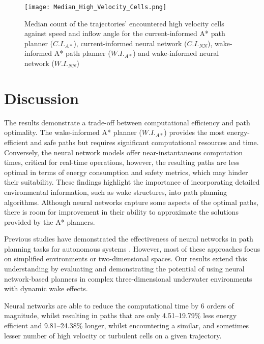 \documentclass[final,5p,times,twocolumn]{elsarticle}
\begin{document}
\begin{figure*}[!h]
    \centering
    \texttt{[image: Median\_High\_Velocity\_Cells.png]}
    \caption{Median count of the trajectories' encountered high velocity cells against speed and inflow angle for the current-informed A* path planner ($C.I._{A*}$), current-informed neural network ($C.I._{NN}$), wake-informed A* path planner ($W.I._{A*}$) and wake-informed neural network ($W.I._{NN}$) }
    \label{fig:median_highvelocity}
\end{figure*}



\section{Discussion} 
\label{Discussion}

The results demonstrate a trade-off between computational efficiency and path optimality. The wake-informed A* planner ($W.I._{A*}$) provides the most energy-efficient and safe paths but requires significant computational resources and time. Conversely, the neural network models offer near-instantaneous computation times, critical for real-time operations, however, the resulting paths are less optimal in terms of energy consumption and safety metrics, which may hinder their suitability. These findings highlight the importance of incorporating detailed environmental information, such as wake structures, into path planning algorithms. Although neural networks capture some aspects of the optimal paths, there is room for improvement in their ability to approximate the solutions provided by the A* planners.

Previous studies have demonstrated the effectiveness of neural networks in path planning tasks for autonomous systems \cite{Tai2017, Pfeiffer2017}. However, most of these approaches focus on simplified environments or two-dimensional spaces. Our results extend this understanding by evaluating and demonstrating the potential of using neural network-based planners in complex three-dimensional underwater environments with dynamic wake effects. 

Neural networks are able to reduce the computational time by 6 orders of magnitude, whilst resulting in paths that are only 4.51--19.79\% less energy efficient and 9.81--24.38\% longer, whilst encountering a similar, and sometimes lesser number of high velocity or turbulent cells on a given trajectory. 
\end{document}
